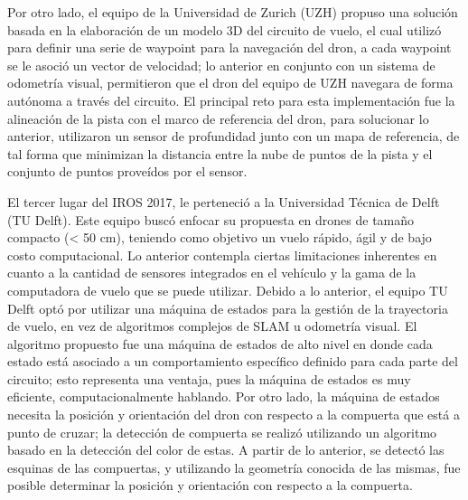 Por otro lado, el equipo de la Universidad de Zurich (UZH) propuso una solución basada en la elaboración de un modelo 3D del circuito de vuelo, el cual utilizó para definir una serie de waypoint para la navegación del dron, a cada waypoint se le asoció un vector de velocidad; lo anterior en conjunto con un sistema de odometría visual, permitieron que el dron del equipo de UZH navegara de forma autónoma a través del circuito. 
El principal reto para esta implementación fue la alineación de la pista con el marco de referencia del dron, para solucionar lo anterior, utilizaron  un sensor de profundidad junto con un mapa de referencia, de tal forma que minimizan la distancia entre la nube de puntos de la pista y el conjunto de puntos proveídos por el sensor.

El tercer lugar del IROS 2017, le perteneció a la Universidad Técnica de Delft (TU Delft). Este equipo buscó enfocar su propuesta en drones de tamaño compacto (< 50 cm), teniendo como objetivo un vuelo rápido, ágil y de bajo costo computacional. Lo anterior contempla ciertas limitaciones inherentes en cuanto a la cantidad de sensores integrados en el vehículo y la gama de la computadora de vuelo que se puede utilizar.
Debido a lo anterior, el equipo TU Delft optó por utilizar una máquina de estados para la gestión de la trayectoria de vuelo, en vez de algoritmos complejos de SLAM u odometría visual. El algoritmo propuesto fue una máquina de estados de alto nivel en donde cada estado está asociado a un comportamiento específico definido para cada parte del circuito; esto representa una ventaja, pues la máquina de estados es muy eficiente, computacionalmente hablando. 
Por otro lado, la máquina de estados necesita la posición y orientación del dron con respecto a la compuerta que está a punto de cruzar; la detección de compuerta se realizó utilizando un algoritmo basado en la detección del color de estas. A partir de lo anterior, se detectó las esquinas de las compuertas, y utilizando la geometría conocida de las mismas, fue posible determinar la posición y orientación con respecto a la compuerta.

